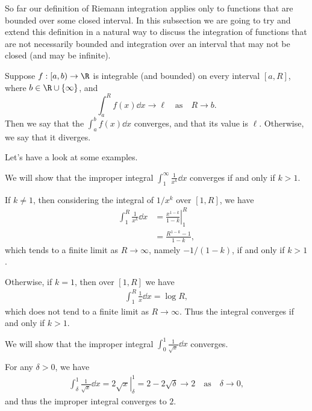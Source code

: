 \documentclass[a4paper]{scrartcl}
\begin{document}
So far our definition of Riemann integration applies only to functions that are bounded over some closed interval. In this subsection we are going to try and extend this definition in a natural way to discuss the integration of functions that are not necessarily bounded and integration over an interval that may not be closed (and may be infinite).

\begin{definition}
	Suppose $f:[a, b) \rightarrow \R$ is integrable (and bounded) on every interval $[a, R]$, where $b \in \R \cup \{\infty\}$, and
	$$
	\int_a^R f(x) \dd x \rightarrow \ell \quad \text{as} \quad R \rightarrow b.
	$$
	Then we say that the  $\int_a^{b} f(x) \dd x$ converges, and that its value is $\ell$. Otherwise, we say that it diverges. 
\end{definition}

Let's have a look at some examples.

\begin{example}
	We will show that the improper integral
	$
	\displaystyle\int_1^{\infty} \frac{1}{x^k} \dd x
	$
	converges if and only if $k > 1$.

	If $k \neq 1$, then considering the integral of $1/x^k$ over $[1, R]$, we have
	\begin{align*}
	\int_1^R \frac{1}{x^k} \dd x &= \left.\frac{x^{1 - k}}{1 - k}\right|_1^R \\
	&= \frac{R^{1 - k} - 1}{1 - k},
	\end{align*}
	which tends to a finite limit as $R \rightarrow \infty$, namely $-1/(1 - k)$, if and only if $k > 1$.

	Otherwise, if $k = 1$, then over $[1 , R]$ we have
	\begin{align*}
		\int_1^R \frac{1}{x} \dd x = \log R,
	\end{align*}
	which does not tend to a finite limit as $R \rightarrow \infty$.
	Thus the integral converges if and only if $k > 1$.
\end{example}

\begin{example}
	We will show that the improper integral
	$\displaystyle \int_0^1 \frac{1}{\sqrt{x}} \dd x$ converges.

	For any $\delta > 0$, we have 
	\begin{align*}
		\int_\delta^1 \frac{1}{\sqrt{x}} \dd x = \left. 2\sqrt{x} \right|_\delta^1 = 2 - 2\sqrt{\delta} \rightarrow 2 \quad \text{as} \quad \delta \rightarrow 0,
	\end{align*}
	and thus the improper integral converges to $2$.
\end{example}
\end{document}
